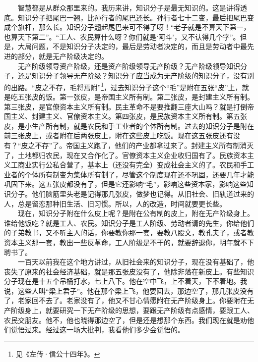 \documentclass[cn,11pt,chinese]{elegantbook}
\begin{document}
　　智慧都是从群众那里来的。我历来讲，知识分子是最无知识的。这是讲得透底。知识分子把尾巴一翘，比孙行者的尾巴还长。孙行者七十二变，最后把尾巴变成个旗杆，那么长。知识分子翘起尾巴来可不得了呀！“老子就是不算天下第一，也算天下第二”。“工人、农民算什么呀？你们就是‘阿斗’，又不认得几个字”。但是，大局问题，不是知识分子决定的，最后是劳动者决定的，而且是劳动者中最先进的部分，就是无产阶级决定的。\\
　　无产阶级领导资产阶级，还是资产阶级领导无产阶级？无产阶级领导知识分子，还是知识分子领导无产阶级？知识分子应当成为无产阶级的知识分子，没有别的出路。“皮之不存，毛将焉附”\footnote[2]{ 见《左传·信公十四年》。}，过去知识分子这个“毛”是附在五张“皮”上，就是吃五张皮的饭。第一张皮，是帝国主义所有制。第二张皮，是封建主义所有制。第三张皮，是官僚资本主义所有制。民主革命不是要推翻三座大山吗？就是打倒帝国主义、封建主义、官僚资本主义。第四张皮，是民族资本主义所有制。第五张皮，是小生产所有制，就是农民和手工业者的个体所有制。过去的知识分子是附在前三张皮上，或者附在后两张皮上，附在这些皮上吃饭。现在这五张皮还有没有？“皮之不存”了。帝国主义跑了，他们的产业都拿过来了。封建主义所有制消灭了，土地都归农民，现在又合作化了。官僚资本主义企业收归国有了。民族资本主义工商业实行公私合营了，基本上（还没有完全）变成社会主义的了。农民和手工业者的个体所有制变为集体所有制了，尽管这个制度现在还不巩固，还要几年才能巩固下来。这五张皮都没有了，但是它还影响“毛”，影响这些资本家，影响这些知识分子。他们脑筋里头老是记得那几张皮，做梦也记得。从旧社会、旧轨道过来的人，总是留恋那种旧生活、旧习惯。所以，人的改造，时间就要更长些。\\
　　现在，知识分子附在什么皮上呢？是附在公有制的皮上，附在无产阶级身上。谁给他饭吃？就是工人、农民。知识分子是工人阶级、劳动者请的先生，你给他们的子弟教书，又不听主人的话，你要教你那一套，要教八股文，教孔夫子，或者教资本主义那一套，教出一些反革命，工人阶级是不干的，就要辞退你，明年就不下聘书了。\\
　　一百天以前我在这个地方讲过，从旧社会来的知识分子，现在没有基础了，他丧失了原来的社会经济基础，就是那五张皮没有了，他除非落在新皮上。有些知识分子现在是十五个吊桶打水，七上八下。他在空中飞，上不着天，下不着地。我说，这些人叫“梁上君子”。他在那个梁上飞，他要回去，那边空了，那几张皮没有了，老家回不去了。老家没有了，他又不甘心情愿附在无产阶级身上。你要附在无产阶级身上，就要研究一下无产阶级的思想，要跟无产阶级有点感情，要跟工人、农民交朋友。他不，他也晓得那边空了，但是还是想那个东西。我们现在就是劝他们觉悟过来。经过这一场大批判，我看他们多少会觉悟的。\\
\end{document}
